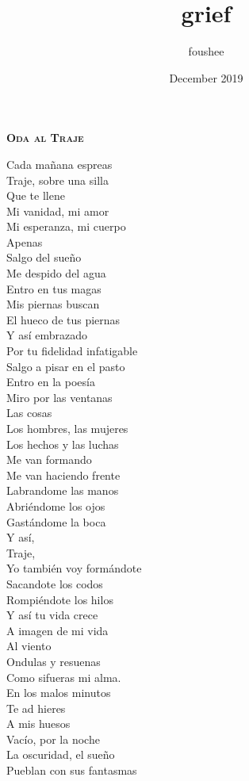 \documentclass{memoir}
\title{grief}
\author{foushee }
\date{December 2019}
\begin{document}
\thispagestyle{empty}
\noindent \textbf{\textsc{\Large Oda al Traje}}
\vspace{18pt}

Cada mañana espreas\\
Traje, sobre una silla\\
Que te llene\\
Mi vanidad, mi amor\\
Mi esperanza, mi cuerpo\\
Apenas\\
Salgo del sueño\\
Me despido del agua\\
Entro en tus magas\\
Mis piernas buscan\\
El hueco de tus piernas\\
Y así embrazado\\
Por tu fidelidad infatigable\\
Salgo a pisar en el pasto\\
Entro en la poesía\\
Miro por las ventanas\\
Las cosas\\
Los hombres, las mujeres\\
Los hechos y las luchas\\
Me van formando\\
Me van haciendo frente\\
Labrandome las manos\\
Abriéndome los ojos\\
Gastándome la boca\\
Y así,\\
Traje,\\
Yo también voy formándote\\
Sacandote los codos\\
Rompiéndote los hilos\\
Y así tu vida crece\\
A imagen de mi vida\\
Al viento\\
Ondulas y resuenas\\
Como sifueras mi alma.\\
En los malos minutos\\
Te ad hieres\\
A mis huesos\\
Vacío, por la noche\\
La oscuridad, el sueño\\
Pueblan con sus fantasmas\\
\end{document}
